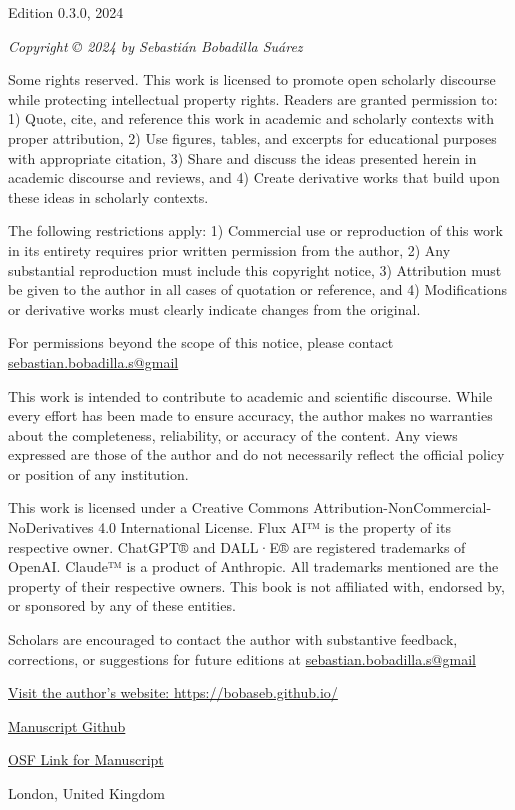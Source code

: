 \thispagestyle{empty}
\begin{center}
    \vspace*{\fill}
    Edition 0.3.0, 2024
    
    \textit{Copyright © 2024 by Sebastián Bobadilla Suárez}

Some rights reserved. This work is licensed to promote open scholarly discourse while protecting intellectual property rights. Readers are granted permission to: 1) Quote, cite, and reference this work in academic and scholarly contexts with proper attribution, 2) Use figures, tables, and excerpts for educational purposes with appropriate citation, 3) Share and discuss the ideas presented herein in academic discourse and reviews, and 4) Create derivative works that build upon these ideas in scholarly contexts.

The following restrictions apply: 1) Commercial use or reproduction of this work in its entirety requires prior written permission from the author, 2) Any substantial reproduction must include this copyright notice, 3) Attribution must be given to the author in all cases of quotation or reference, and 4) Modifications or derivative works must clearly indicate changes from the original.

For permissions beyond the scope of this notice, please contact \href{mailto:sebastian.bobadilla.s@gmail.com}{sebastian.bobadilla.s@gmail}

This work is intended to contribute to academic and scientific discourse. While every effort has been made to ensure accuracy, the author makes no warranties about the completeness, reliability, or accuracy of the content. Any views expressed are those of the author and do not necessarily reflect the official policy or position of any institution.

This work is licensed under a Creative Commons Attribution-NonCommercial-NoDerivatives 4.0 International License. Flux AI™ is the property of its respective owner. ChatGPT® and DALL·E® are registered trademarks of OpenAI. Claude™ is a product of Anthropic. All trademarks mentioned are the property of their respective owners. This book is not affiliated with, endorsed by, or sponsored by any of these entities.

Scholars are encouraged to contact the author with substantive feedback, corrections, or suggestions for future editions at \href{mailto:sebastian.bobadilla.s@gmail.com}{sebastian.bobadilla.s@gmail}

    \href{https://bobaseb.github.io/}{Visit the author's website: https://bobaseb.github.io/}

    \href{https://github.com/bobaseb/energetically-coherent-computation}{Manuscript Github}

    \href{TODO}{OSF Link for Manuscript}
    
    London, United Kingdom
    \vspace*{\fill}
\end{center}